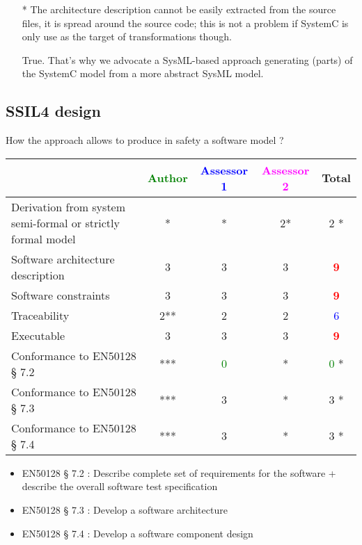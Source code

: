 \begin{assessor2}
  \begin{itemize}
  \item[*] The architecture description cannot be easily extracted
    from the source files, it is spread around the source code; this
    is not a problem if SystemC is only use as the target of
    transformations though.
\begin{author_comment}
True. That's why we advocate a SysML-based approach generating (parts) of the SystemC model from a more abstract SysML model.
\end{author_comment}
  \end{itemize}  
\end{assessor2}


\subsection{SSIL4 design}

How the approach allows to produce in safety a software model ?

\begin{tabular}{|l | c | c | c | c|}
\hline
& \textcolor{green}{Author} & \textcolor{blue}{Assessor 1} & \textcolor{magenta}{Assessor 2} & Total \\
\hline
Derivation from system semi-formal or strictly formal model &* & * &2* & 2    * \\
\hline
Software architecture description &3 & 3     &3 & \textcolor{red}{\textbf{9}} \\
\hline
Software constraints &3 &3 &3 & \textcolor{red}{\textbf{9}} \\
\hline
Traceability &2** &2 &2 & \textcolor{blue}{6} \\
\hline
Executable &3 &3 &3 & \textcolor{red}{\textbf{9}} \\
\hline
Conformance to EN50128 § 7.2 &*** & \textcolor{green}{0}   & *  & \textcolor{green}{0} * \\
\hline
Conformance to EN50128 § 7.3 &*** &3 &  * & 3    * \\
\hline
Conformance to EN50128 § 7.4 &*** &3 & * & 3    * \\
\hline
\end{tabular}
\begin{assessor1}
\begin{itemize}
\item  EN50128 § 7.2 : Describe complete set of requirements for the
  software + describe the overall software test specification
\item EN50128 § 7.3 :  Develop a software architecture 
\item EN50128 § 7.4 : Develop a software component design
\end{itemize}
\end{assessor1}

